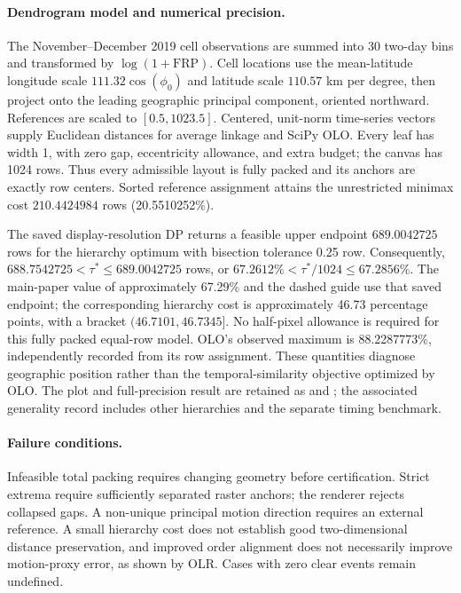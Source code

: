 \paragraph{Dendrogram model and numerical precision.}
The November--December 2019 cell observations are summed into 30 two-day bins and transformed by $\log(1+\mathrm{FRP})$. Cell locations use the mean-latitude longitude scale $111.32\cos(\phi_0)$ and latitude scale $110.57$ km per degree, then project onto the leading geographic principal component, oriented northward. References are scaled to $[0.5,1023.5]$. Centered, unit-norm time-series vectors supply Euclidean distances for average linkage and SciPy OLO. Every leaf has width 1, with zero gap, eccentricity allowance, and extra budget; the canvas has 1024 rows. Thus every admissible layout is fully packed and its anchors are exactly row centers. Sorted reference assignment attains the unrestricted minimax cost $210.4424984$ rows (20.5510252\%).

The saved display-resolution DP returns a feasible upper endpoint $689.0042725$ rows for the hierarchy optimum with bisection tolerance 0.25 row. Consequently, $688.7542725<\tau^*\le689.0042725$ rows, or $67.2612\%<\tau^*/1024\le67.2856\%$. The main-paper value of approximately 67.29\% and the dashed guide use that saved endpoint; the corresponding hierarchy cost is approximately 46.73 percentage points, with a bracket $(46.7101,46.7345]$. No half-pixel allowance is required for this fully packed equal-row model. OLO's observed maximum is 88.2287773\%, independently recorded from its row assignment. These quantities diagnose geographic position rather than the temporal-similarity objective optimized by OLO. The plot and full-precision result are retained as  and ; the associated generality record includes other hierarchies and the separate timing benchmark.

\paragraph{Failure conditions.} Infeasible total packing requires changing geometry before certification. Strict extrema require sufficiently separated raster anchors; the renderer rejects collapsed gaps. A non-unique principal motion direction requires an external reference. A small hierarchy cost does not establish good two-dimensional distance preservation, and improved order alignment does not necessarily improve motion-proxy error, as shown by OLR. Cases with zero clear events remain undefined.


